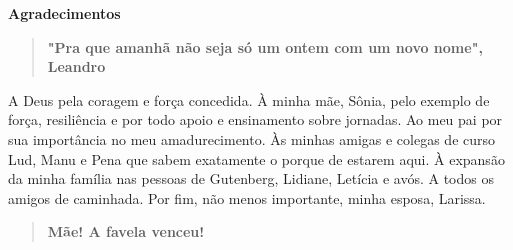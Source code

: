 
\begin{center}
\huge{{\bf Agradecimentos}}
\vspace{4cm}
\end{center}

\begin{center}
	\begin{quotation}
		{\bf "Pra que amanh\~{a} n\~{a}o seja s\'{o} um ontem com um novo nome", Leandro}
	\end{quotation}
\end{center}



A Deus pela coragem e for\c{c}a concedida. \`{A} minha m\~{a}e, S\^{o}nia, pelo exemplo de for\c{c}a, resili\^{e}ncia e por todo apoio e ensinamento sobre jornadas. Ao meu pai por sua import\^{a}ncia no meu amadurecimento. \`{A}s minhas amigas e colegas de curso Lud, Manu e Pena que sabem exatamente o porque de estarem aqui. \`{A} expans\~{a}o da minha fam\'{i}lia nas pessoas de Gutenberg, Lidiane, Let\'{i}cia e av\'{o}s. A todos os amigos de caminhada. Por fim, n\~{a}o menos importante, minha esposa, Larissa.


\begin{center}
	\begin{quotation}
		{\bf M\~{a}e! A favela venceu!}
	\end{quotation}
\end{center}

 
\clearpage
\thispagestyle{empty}
\cleardoublepage